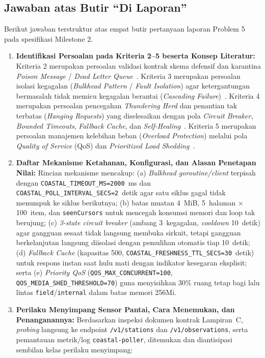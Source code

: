 \vspace{1em}

\subsection{Jawaban atas Butir ``Di Laporan''}
Berikut jawaban terstruktur atas empat butir pertanyaan laporan Problem 5 pada spesifikasi Milestone 2.
\begin{enumerate}
    \item \textbf{Identifikasi Persoalan pada Kriteria 2--5 beserta Konsep Literatur:} Kriteria 2 merupakan persoalan validasi kontrak skema defensif dan karantina \textit{Poison Message} / \textit{Dead Letter Queue}~\cite{hohpe2003enterprise}. Kriteria 3 merupakan persoalan isolasi kegagalan (\textit{Bulkhead Pattern} / \textit{Fault Isolation}) agar ketergantungan bermasalah tidak memicu kegagalan berantai (\textit{Cascading Failure})~\cite{nygard2018release}. Kriteria 4 merupakan persoalan pencegahan \textit{Thundering Herd} dan penantian tak terbatas (\textit{Hanging Requests}) yang diselesaikan dengan pola \textit{Circuit Breaker}, \textit{Bounded Timeouts}, \textit{Fallback Cache}, dan \textit{Self-Healing}~\cite{nygard2018release,newman2021building}. Kriteria 5 merupakan persoalan manajemen kelebihan beban (\textit{Overload Protection}) melalui pola \textit{Quality of Service} (QoS) dan \textit{Prioritized Load Shedding}~\cite{beyer2016sre}.
    \item \textbf{Daftar Mekanisme Ketahanan, Konfigurasi, dan Alasan Penetapan Nilai:} Rincian mekanisme mencakup: (a) \textit{Bulkhead goroutine/client} terpisah dengan \texttt{COASTAL\_TIMEOUT\_MS=2000}~ms dan \texttt{COASTAL\_POLL\_INTERVAL\_SECS=2}~detik agar satu siklus gagal tidak menumpuk ke siklus berikutnya; (b) batas muatan 4~MiB, 5~halaman $\times$ 100~item, dan \texttt{seenCursors} untuk mencegah konsumsi memori dan loop tak berujung; (c) \textit{3-state circuit breaker} (ambang 3~kegagalan, \textit{cooldown} 10~detik) agar gangguan sesaat tidak langsung membuka sirkuit, tetapi gangguan berkelanjutan langsung diisolasi dengan pemulihan otomatis tiap 10~detik; (d) \textit{Fallback Cache} (kapasitas 500, \texttt{COASTAL\_FRESHNESS\_TTL\_SECS=30}~detik) untuk respons instan saat hulu mati dengan indikator kesegaran eksplisit; serta (e) \textit{Priority QoS} (\texttt{QOS\_MAX\_CONCURRENT=100}, \texttt{QOS\_MEDIA\_SHED\_THRESHOLD=70}) guna menyisihkan 30\% ruang tetap bagi lalu lintas \texttt{field}/\texttt{internal} dalam batas memori 256Mi.
    \item \textbf{Perilaku Menyimpang Sensor Pantai, Cara Menemukan, dan Penanganannya:} Berdasarkan inspeksi dokumen kontrak Lampiran~C, \textit{probing} langsung ke endpoint \texttt{/v1/stations} dan \texttt{/v1/observations}, serta pemantauan metrik/log \texttt{coastal-poller}, ditemukan dan diantisipasi sembilan kelas perilaku menyimpang:

\end{enumerate}
